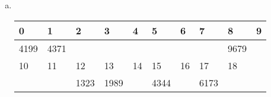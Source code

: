 \documentclass{article}
\begin{document}
\begin{enumerate}[(a)]
\begin{center}
\end{center}
\item\ 
\begin{center}
\begin{tabular}{|m{2em}<{\centering}|m{2em}<{\centering}|m{2em}<{\centering}|m{2em}<{\centering}|m{2em}<{\centering}|m{2em}<{\centering}|m{2em}<{\centering}|m{2em}<{\centering}|m{2em}<{\centering}|m{2em}<{\centering}|}
\hline
0 & 1 & 2 & 3 & 4 & 5 & 6 & 7 & 8 & 9 \\\hline
4199 & 4371 && &&&&& 9679 & \\\hline
10 & 11 & 12 & 13 & 14 & 15 & 16 & 17 & 18 & \\\hline
& & 1323 & 1989 & & 4344 & & 6173 & & \\\hline
\end{tabular}
\end{center}
\end{enumerate}
\end{document}
